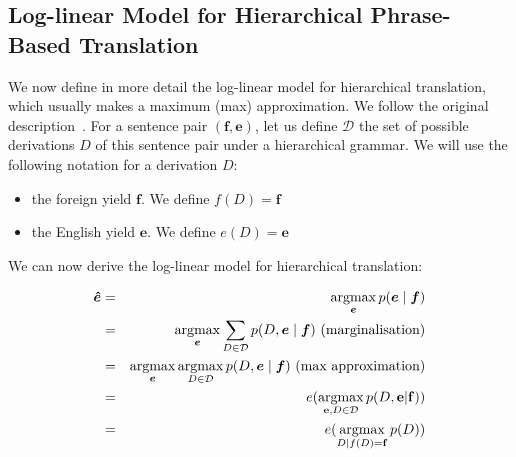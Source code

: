     \subsection{Log-linear Model for Hierarchical Phrase-Based Translation} \label{sec:loglinear}

    We now define in more detail the log-linear model for hierarchical translation, which usually makes a maximum (max) approximation.
    We follow the original description~\citep{chiang:2007:CL}.
    For a sentence pair $(\bm{f}, \bm{e})$, let us define $\mathcal{D}$ the set of possible derivations $D$ of this sentence pair under 
    a hierarchical grammar. We will use the following notation for a derivation $D$:
    
    \begin{itemize}
      \item the foreign yield $\bm{f}$. We define $f(D) = \bm{f}$
      \item the English yield $\bm{e}$. We define $e(D) = \bm{e}$
    \end{itemize}

    We can now derive the log-linear model for hierarchical translation:

    \begin{eqnarray}
      \bm{\hat{e}} &=& \operatorname*{argmax}_{\bm{e}} p(\bm{e} \mid \bm{f}) \nonumber \\
                    &=& \operatorname*{argmax}_{\bm{e}} \sum_{D \in \mathcal{D}} p(D,\bm{e} \mid \bm{f}) \mbox{ (marginalisation)} \nonumber \\
                    &=& \operatorname*{argmax}_{\bm{e}} \operatorname*{argmax}_{D \in \mathcal{D}} p(D,\bm{e} \mid \bm{f}) \mbox{ (max approximation)} \nonumber \\
                    &=& e(\operatorname*{argmax}_{{\bf e},D \in \mathcal{D}} p(D,{\bf e}|{\bf f})) \nonumber \\
                    &=& e(\operatorname*{argmax}_{D | f(D) = {\bf f}} p(D))
    \end{eqnarray}

